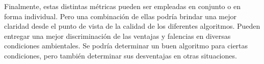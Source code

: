 Finalmente, estas distintas métricas pueden ser empleadas en conjunto o en forma individual. Pero una combinación de ellas podría brindar una mejor claridad desde el punto de vista de la calidad de los diferentes algoritmos. Pueden entregar una mejor discriminación de las ventajas y falencias en diversas condiciones ambientales. Se podría determinar un buen algoritmo para ciertas condiciones, pero también determinar sus desventajas en otras situaciones. 





